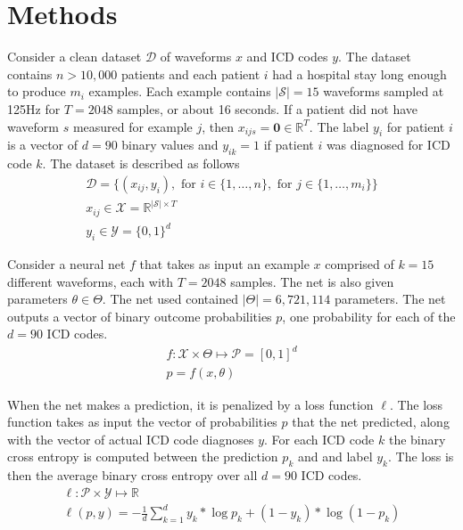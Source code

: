 \figIcuIcdMi
\figIcuExampleWaveforms

\pagebreak
\section{Methods}

Consider a clean dataset $\mathcal{D}$ of waveforms $x$ and ICD codes $y$.  The dataset contains $n > 10,000$ patients and each patient $i$ had a hospital stay long enough to produce $m_i$ examples.  Each example contains $|\mathcal{S}|=15$ waveforms sampled at 125Hz for $T = 2048$ samples, or about 16 seconds.  If a patient did not have waveform $s$ measured for example $j$, then $x_{ijs} = \mathbf{0} \in \mathbb{R}^T$.  The label $y_i$ for patient $i$ is a vector of $d=90$ binary values and $y_{ik} = 1$ if patient $i$ was diagnosed for ICD code $k$.  The dataset is described as follows
\begin{gather}
    \mathcal{D} = \{
        (x_{ij}, y_i),
        \text{ for } i \in \{ 1, \dots, n \},
        \text{ for } j \in \{ 1, \dots, m_i \}
    \} \\
    x_{ij} \in \mathcal{X} = \mathbb{R}^{|\mathcal{S}| \times T} \\
    y_i \in \mathcal{Y} = \{0, 1\}^d
\end{gather}

Consider a neural net $f$ that takes as input an example $x$ comprised of $k=15$ different waveforms, each with $T=2048$ samples.  The net is also given parameters $\theta \in \Theta$.  The net used contained $|\Theta| = 6,721,114$ parameters.  The net outputs a vector of binary outcome probabilities $p$, one probability for each of the $d=90$ ICD codes.
\begin{gather}
    f: \mathcal{X} \times \Theta \mapsto \mathcal{P} = [0, 1]^d \\
    p = f(x, \theta)
\end{gather}

When the net makes a prediction, it is penalized by a loss function $\ell$.  The loss function takes as input the vector of probabilities $p$ that the net predicted, along with the vector of actual ICD code diagnoses $y$.  For each ICD code $k$ the binary cross entropy is computed between the prediction $p_k$ and and label $y_k$.  The loss is then the average binary cross entropy over all $d=90$ ICD codes.
\begin{gather}
    \ell: \mathcal{P} \times \mathcal{Y} \mapsto \mathbb{R} \\
    \ell(p, y) = -\frac{1}{d} \sum_{k=1}^d 
        y_k * \log p_k + (1 - y_k) * \log(1 - p_k)
\end{gather}

